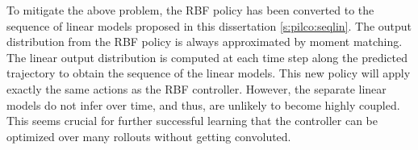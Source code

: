 \begin{figure}[!ht]
    \centering
    \begin{floatrow}
    \end{floatrow}
\end{figure}

\noindent To mitigate the above problem, the RBF policy has been converted to the sequence of linear models proposed in this dissertation \ref{s:pilco:seqlin}. The output distribution from the RBF policy is always approximated by moment matching. The linear output distribution is computed at each time step along the predicted trajectory to obtain the sequence of the linear models. This new policy will apply exactly the same actions as the RBF controller. However, the separate linear models do not infer over time, and thus, are unlikely to become highly coupled. This seems crucial for further successful learning that the controller can be optimized over many rollouts without getting convoluted.

